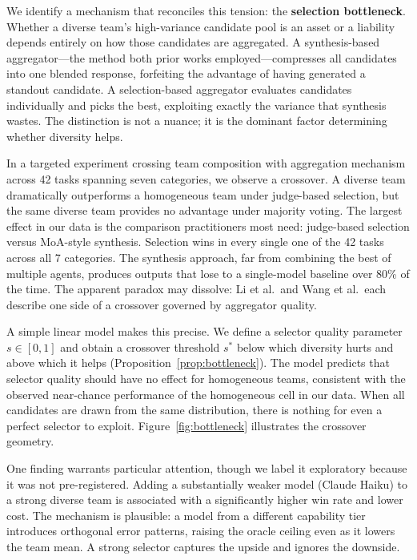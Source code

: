 \documentclass[10pt,twocolumn]{article}
\theoremstyle{remark}
\begin{document}
We identify a mechanism that reconciles this tension: the \textbf{selection bottleneck}. Whether a diverse team's high-variance candidate pool is an asset or a liability depends entirely on how those candidates are aggregated. A synthesis-based aggregator---the method both prior works employed---compresses all candidates into one blended response, forfeiting the advantage of having generated a standout candidate. A selection-based aggregator evaluates candidates individually and picks the best, exploiting exactly the variance that synthesis wastes. The distinction is not a nuance; it is the dominant factor determining whether diversity helps.

In a targeted experiment crossing team composition with aggregation mechanism across 42 tasks spanning seven categories, we observe a crossover. A diverse team dramatically outperforms a homogeneous team under judge-based selection, but the same diverse team provides no advantage under majority voting. The largest effect in our data is the comparison practitioners most need: judge-based selection versus MoA-style synthesis. Selection wins in every single one of the 42 tasks across all 7 categories. The synthesis approach, far from combining the best of multiple agents, produces outputs that lose to a single-model baseline over 80\% of the time. The apparent paradox may dissolve: Li et al.\ and Wang et al.\ each describe one side of a crossover governed by aggregator quality.

A simple linear model makes this precise. We define a selector quality parameter $s \in [0,1]$ and obtain a crossover threshold $s^*$ below which diversity hurts and above which it helps (Proposition~\ref{prop:bottleneck}). The model predicts that selector quality should have no effect for homogeneous teams, consistent with the observed near-chance performance of the homogeneous cell in our data. When all candidates are drawn from the same distribution, there is nothing for even a perfect selector to exploit. Figure~\ref{fig:bottleneck} illustrates the crossover geometry.

One finding warrants particular attention, though we label it exploratory because it was not pre-registered. Adding a substantially weaker model (Claude Haiku) to a strong diverse team is associated with a significantly higher win rate and lower cost. The mechanism is plausible: a model from a different capability tier introduces orthogonal error patterns, raising the oracle ceiling even as it lowers the team mean. A strong selector captures the upside and ignores the downside.
\end{document}
